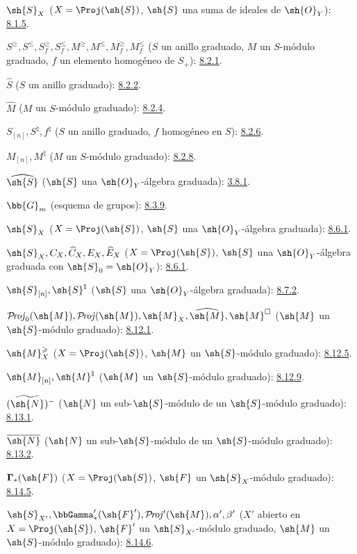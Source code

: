 \documentclass[oneside,10pt]{amsart}
\renewcommand{\leq}{\leqslant}
\renewcommand{\geq}{\geqslant}
\def\shProj{\mathcal{P}\!\mathit{roj}}
\begin{document}
$\sh{S}_X$ ($X=\Proj(\sh{S})$, $\sh{S}$ una suma de ideales de
$\sh{O}_Y$): \hyperref[II.8.1.5]{8.1.5}.

$S^\geq,S^\leq,S_f^\geq,S_f^\leq,
M^\geq,M^\leq,M_f^\geq,M_f^\leq$
($S$ un anillo graduado, $M$ un $S$-módulo graduado,
$f$ un elemento homogéneo de $S_+$): \hyperref[II.8.2.1]{8.2.1}.

$\widehat S$ ($S$ un anillo graduado): \hyperref[II.8.2.2]{8.2.2}.

$\widehat M$ ($M$ un $S$-módulo graduado): \hyperref[II.8.2.4]{8.2.4}.

$S_{[n]},S^\natural,f^\natural$
($S$ un anillo graduado, $f$ homogéneo en $S$): \hyperref[II.8.2.6]{8.2.6}.

$M_{[n]},M^\natural$ ($M$ un $S$-módulo graduado): \hyperref[II.8.2.8]{8.2.8}.

$\widehat{\sh{S}}$ ($\sh{S}$ una $\sh{O}_Y$-álgebra graduada): \hyperref[II.8.3.1]{3.8.1}.

$\bb{G}_m$ (esquema de grupos): \hyperref[II.8.3.9]{8.3.9}.

$\sh{S}_X$ ($X=\Proj(\sh{S})$, $\sh{S}$ una $\sh{O}_Y$-álgebra graduada): \hyperref[II.8.6.1]{8.6.1}.

$\sh{S}_X,C_X,\widehat C_X,E_X,\widehat E_X$
($X=\Proj(\sh{S})$, $\sh{S}$ una $\sh{O}_Y$-álgebra graduada
con $\sh{S}_0=\sh{O}_Y$): \hyperref[II.8.6.1]{8.6.1}.

$\sh{S}_{[n]},\sh{S}^{\natural}$
($\sh{S}$ una $\sh{O}_Y$-álgebra graduada): \hyperref[II.8.7.2]{8.7.2}.

$\shProj_0(\sh{M}),\shProj(\sh{M}),\sh{M}_X,
\widehat{\sh{M}},\sh{M}^{\square}$
($\sh{M}$ un $\sh{S}$-módulo graduado): \hyperref[II.8.12.1]{8.12.1}.

$\sh{M}_X^\geq$
($X=\Proj(\sh{S})$, $\sh{M}$ un $\sh{S}$-módulo graduado): \hyperref[II.8.12.5]{8.12.5}.

$\sh{M}_{[n]},\sh{M}^{\natural}$
($\sh{M}$ un $\sh{S}$-módulo graduado): \hyperref[II.8.12.9]{8.12.9}.

$(\widetilde{\sh{N}})^-$
($\sh{N}$ un sub-$\sh{S}$-módulo de un $\sh{S}$-módulo graduado): \hyperref[II.8.13.1]{8.13.1}.

$\overline{\sh{N}}$
($\sh{N}$ un sub-$\sh{S}$-módulo de un $\sh{S}$-módulo graduado): \hyperref[II.8.13.2]{8.13.2}.

$\boldsymbol{\Gamma}_*(\sh{F})$
($X=\Proj(\sh{S})$, $\sh{F}$ un $\sh{S}_X$-módulo graduado): \hyperref[II.8.14.5]{8.14.5}.

$\sh{S}_{X'},\bbGamma'_*(\sh{F}'),\shProj'(\sh{M}),
\alpha',\beta'$
($X'$ abierto en $X=\Proj(\sh{S})$, $\sh{F}'$ un $\sh{S}_{X'}$-módulo graduado,
$\sh{M}$ un $\sh{S}$-módulo graduado): \hyperref[II.8.14.6]{8.14.6}.
\end{document}
